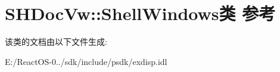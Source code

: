 \hypertarget{class_s_h_doc_vw_1_1_shell_windows}{}\section{S\+H\+Doc\+Vw\+:\+:Shell\+Windows类 参考}
\label{class_s_h_doc_vw_1_1_shell_windows}


该类的文档由以下文件生成\+:\begin{DoxyCompactItemize}
\item 
E\+:/\+React\+O\+S-\/0../sdk/include/psdk/exdisp.\+idl\end{DoxyCompactItemize}
